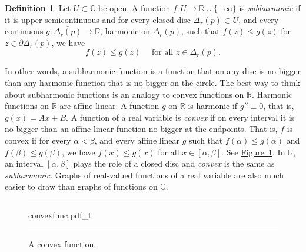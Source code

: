 \documentclass[12pt,openany]{book}
\newcommand{\C}{{\mathbb{C}}}
\newcommand{\R}{{\mathbb{R}}}
\newcommand{\myindex}[1]{#1\index{#1}}
\theoremstyle{plain}
\theoremstyle{remark}
\theoremstyle{definition}
\newtheorem{defn}[thm]{Definition}
\newenvironment{myfig}{%
\begin{figure}[h!t]
\noindent\rule{\textwidth}{0.5pt}\vspace{12pt}\par\centering}%
{\par\noindent\rule{\textwidth}{0.5pt}
\end{figure}}
\theoremstyle{exercise}
\theoremstyle{example}
\newcommand{\figureref}[1]{\hyperref[#1]{Figure~\ref*{#1}}}
\begin{document}
\begin{defn}
Let $U \subset \C$ be open.
A function $f \colon U \to \R \cup \{ -\infty \}$ is 
\emph{\myindex{subharmonic}} if it is upper-semicontinuous
and for every closed disc $\overline{\Delta_r(p)} \subset U$,
and every continuous $g \colon \overline{\Delta_r(p)} \to \R$,
harmonic on $\Delta_r(p)$,
such that $f(z) \leq g(z)$ for $z \in \partial \Delta_r(p)$, we have
\begin{equation*}
f(z) \leq g(z) \quad \text{ for all } z \in \Delta_r(p) .
\end{equation*}
\end{defn}

In other words, a subharmonic function is a function that on any disc
is no bigger than any harmonic function that is no bigger on the circle.
The best way to think about subharmonic functions is an analogy to convex
functions on $\R$.
Harmonic functions on $\R$ are affine linear:
A function $g$ on $\R$ is harmonic if $g'' \equiv 0$, that is, $g(x) = Ax+B$.
A function of a real variable is
\emph{convex} if 
on every interval it is no bigger than an affine linear function 
no bigger at the endpoints.
That is,
$f$ is convex if for every $\alpha < \beta$,
and every affine linear $g$ such that
$f(\alpha) \leq g(\alpha)$
and
$f(\beta) \leq g(\beta)$,
we have
$f(x) \leq g(x)$ for all $x \in [\alpha,\beta]$.
See \figureref{fig:convexfunc}.
In $\R$, an interval $[\alpha,\beta]$ plays the role of a closed disc
and \emph{convex} is the same as \emph{subharmonic}.
Graphs of real-valued functions of a real variable
are also much easier to draw than graphs of functions on $\C$.

\begin{myfig}
{convexfunc.pdf_t}
\caption{A convex function.\label{fig:convexfunc}}
\end{myfig}
\end{document}
